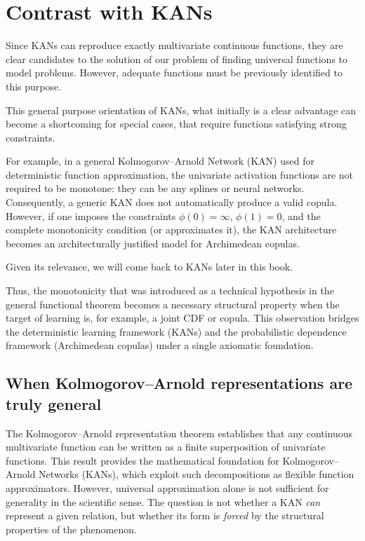 \section{Contrast with KANs}
Since KANs can reproduce exactly multivariate continuous functions, they are clear candidates to the solution of our problem of finding universal functions to model problems. However, adequate functions must be previously identified to this purpose.

This general purpose orientation of KANs, what initially is a clear advantage can become a shortcoming for special cases, that require functions satisfying strong constraints.

For example, in a general Kolmogorov–Arnold Network (KAN) used for deterministic function approximation, the univariate activation functions are not required to be monotone: they can be any splines or neural networks.  Consequently, a generic KAN does not automatically produce a valid copula.  However, if one imposes the constraints $\phi(0)=\infty$, $\phi(1)=0$, and the complete monotonicity condition (or approximates it), the KAN architecture becomes an architecturally justified model for Archimedean copulas.

Given its relevance, we will come back to KANs later in this book.


Thus, the monotonicity that was introduced as a technical hypothesis in the general functional theorem becomes a necessary structural property when the target of learning is, for example, a joint CDF or copula.  This observation bridges the deterministic learning framework (KANs) and the probabilistic dependence framework (Archimedean copulas) under a single axiomatic foundation.

\subsection{When Kolmogorov--Arnold representations are truly general}
\label{ssec:kan_general}

The Kolmogorov--Arnold representation theorem establishes that any
continuous multivariate function can be written as a finite superposition
of univariate functions.  This result provides the mathematical foundation
for Kolmogorov--Arnold Networks (KANs), which exploit such decompositions
as flexible function approximators.  However, universal approximation alone is not
sufficient for generality in the scientific sense.  The question is not
whether a KAN \emph{can} represent a given relation, but whether its form is
\emph{forced} by the structural properties of the phenomenon.

